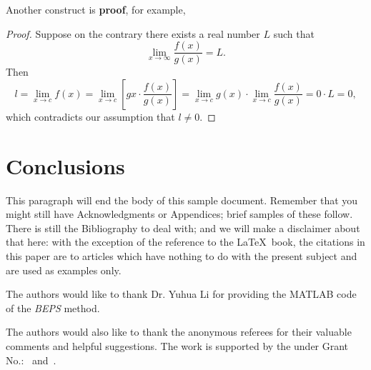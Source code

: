 Another construct is \textbf{proof}, for example,

\begin{proof}
	Suppose on the contrary there exists a real number $L$ such that
	\begin{displaymath}
	\lim_{x\rightarrow\infty} \frac{f(x)}{g(x)} = L.
	\end{displaymath}
	Then
	\begin{displaymath}
	l=\lim_{x\rightarrow c} f(x)
	= \lim_{x\rightarrow c}
	\left[ g{x} \cdot \frac{f(x)}{g(x)} \right ]
	= \lim_{x\rightarrow c} g(x) \cdot \lim_{x\rightarrow c}
	\frac{f(x)}{g(x)} = 0\cdot L = 0,
	\end{displaymath}
	which contradicts our assumption that $l\neq 0$.
\end{proof}

\section{Conclusions}
This paragraph will end the body of this sample document.
Remember that you might still have Acknowledgments or
Appendices; brief samples of these
follow.  There is still the Bibliography to deal with; and
we will make a disclaimer about that here: with the exception
of the reference to the \LaTeX\ book, the citations in
this paper are to articles which have nothing to
do with the present subject and are used as
examples only.


\begin{acks}
	The authors would like to thank Dr. Yuhua Li for providing the
	MATLAB code of the \textit{BEPS} method.
	
	The authors would also like to thank the anonymous referees for
	their valuable comments and helpful suggestions. The work is
	supported by the  under Grant
	No.:~
	and~.
	
\end{acks}
